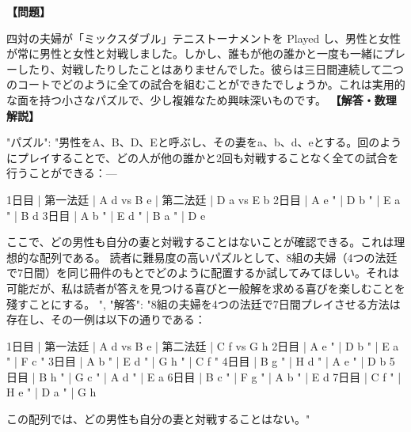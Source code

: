 \documentclass[10pt,a4paper,oneside,openany]{ltjsbook}
\begin{document}
\begin{tcolorbox}[colback=softblue,colframe=primaryblue,title=\textbf{第 266 問：A TENNIS TOURNAMENT.},arc=2mm,boxrule=1pt,breakable]
\textbf{【問題】}\par\vspace{0.3em}
四対の夫婦が「ミックスダブル」テニストーナメントを Played し、男性と女性が常に男性と女性と対戦しました。しかし、誰もが他の誰かと一度も一緒にプレーしたり、対戦したりしたことはありませんでした。彼らは三日間連続して二つのコートでどのように全ての試合を組むことができたでしょうか。これは実用的な面を持つ小さなパズルで、少し複雑なため興味深いものです。
\tcblower
\textbf{【解答・数理解説】}\par\vspace{0.3em}
{
  "パズル": "男性をA、B、D、Eと呼ぶし、その妻をa、b、d、eとする。回のようにプレイすることで、どの人が他の誰かと2回も対戦することなく全ての試合を行うことができる：---

1日目 | 第一法廷 | A d vs B e | 第二法廷 | D a vs E b
2日目 | A e    "   | D b    "   | E a    "   | B d
3日目 | A b    "   | E d    "   | B a    "   | D e

ここで、どの男性も自分の妻と対戦することはないことが確認できる。これは理想的な配列である。
読者に難易度の高いパズルとして、8組の夫婦（4つの法廷で7日間）を同じ冊件のもとでどのように配置するか試してみてほしい。それは可能だが、私は読者が答えを見つける喜びと一般解を求める喜びを楽しむことを殘すことにする。
",
  "解答": "8組の夫婦を4つの法廷で7日間プレイさせる方法は存在し、その一例は以下の通りである：

1日目 | 第一法廷 | A d vs B e | 第二法廷 | C f vs G h
2日目 | A e    "   | D b    "   | E a    "   | F c    "
3日目 | A b    "   | E d    "   | G h    "   | C f    "
4日目 | B g    "   | H d    "   | A e    "   | D b
5日目 | B h    "   | G c    "   | A d    "   | E a
6日目 | B c    "   | F g    "   | A b    "   | E d
7日目 | C f    "   | H e    "   | D a    "   | G h

この配列では、どの男性も自分の妻と対戦することはない。"
}
\end{tcolorbox}
\end{document}
